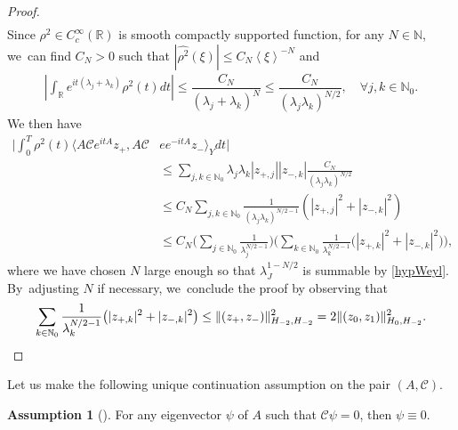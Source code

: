 \documentclass[10pt]{amsart}
\theoremstyle{definition}
\newtheorem{assum}{Assumption}
\newenvironment{assump}[2][]
{\renewcommand\theassum{#2}\begin{assum}[#1]}
{\end{assum}}
\let\mc\mathcal
\let\ld\lambda
\newcommand{\R}{\mathbb{R}}
\newcommand{\N}{\mathbb{N}}
\providecommand{\norm}[1]{\lVert#1\rVert}
\providecommand{\inn}[1]{\langle#1\rangle}
\begin{document}
\begin{proof}
\begin{align*}
\end{align*}
Since $\rho^2\in C_c^\infty(\R)$ is smooth compactly supported function, for any $N\in \N$, we~can find $C_N>0$ such that $|\widehat{\rho^2}(\xi)|\leq C_N \left<\xi\right>^{-N}$ and
\begin{align*}
\left|\int_\R e^{it(\ld_j+\ld_k)}\rho^2(t)dt\right|\leq \dfrac{C_N}{(\ld_j+\ld_k)^{N}} \leq\dfrac{C_N}{(\ld_j\ld_k)^{N/2}},\quad \forall j, k\in \N_0.
\end{align*}
We then have
\begin{align*}
\biggl|\int_0^T \rho^2(t)\inn{A\mc{C}e^{itA}z_+, A\mc{C}&ee^{-itA}z_-}_{Y}dt\biggr|\\
&\leq \sum_{j, k\in \N_0} \ld_j\ld_k |z_{+, j}||z_{-, k}|\frac{C_N}{(\ld_j\ld_k)^{N/2}}\\
&\leq C_N\sum_{j, k\in \N_0} \frac{1}{(\ld_j\ld_k)^{N/2-1}}\left(|z_{+, j}|^2+|z_{-, k}|^2\right)\\
&\leq C_N\biggl(\sum_{j\in \N_0}\frac{1}{\ld_j^{N/2-1}}\biggr)
\biggl(\sum_{k\in \N_0} \frac{1}{\ld_k^{N/2-1}}\big(|z_{+, k}|^2+|z_{-, k}|^2\big)\biggr),
\end{align*}
where we have chosen $N$ large enough so that $\ld_J^{1-N/2}$ is summable by \eqref{hypWeyl}. By~adjusting $N$ if necessary, we~conclude the proof by observing that
\begin{align*}
\sum_{k\in \N_0} \dfrac{1}{\ld_k^{N/2-1}} \big(|z_{+, k}|^2+|z_{-, k}|^2\big)\leq \norm{(z_+, z_-)}_{H_{-2}, H_{-2}}^2=2\norm{(z_0, z_1)}_{H_{0}, H_{-2}}^2.\qedhere
\end{align*}
\end{proof}

Let us make the following unique continuation assumption on the pair $(A, \mc{C})$.

\begin{assump}{UCP}\label{assumAeigen}
For any eigenvector $\psi$ of $A$ such that $\mc{C}\psi=0$, then $\psi\equiv 0$.
\end{assump}
\end{document}
